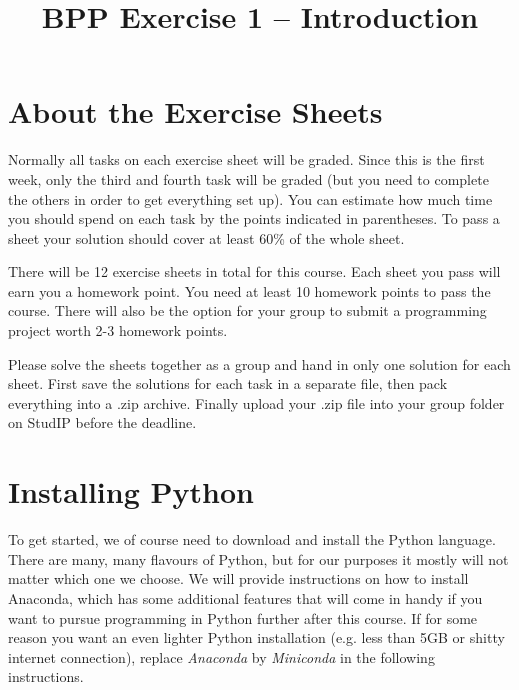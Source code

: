 

\makeatletter
{}
\tw@make@key@macro*{\OS}
\makeatother

\title{BPP Exercise 1 -- Introduction}




\section*{About the Exercise Sheets}

Normally all tasks on each exercise sheet will be graded. Since this is the first week, only the third and fourth task will be graded (but you need to complete the others in order to get everything set up). You can estimate how much time you should spend on each task by the points indicated in parentheses. To pass a sheet your solution should cover at least 60\% of the whole sheet.

\vspace{1em}

\noindent There will be 12 exercise sheets in total for this course. Each sheet you pass will earn you a homework point. You need at least 10 homework points to pass the course. There will also be the option for your group to submit a programming project worth 2-3 homework points.

\vspace{1em}

\noindent Please solve the sheets together as a group and hand in only one solution for each sheet. First save the solutions for each task in a separate file, then pack everything into a .zip archive. Finally upload your .zip file into your group folder on StudIP before the deadline.


\section{Installing Python}

To get started, we of course need to download and install the Python language. There are many, many flavours of Python, but for our purposes it mostly will not matter which one we choose. We will provide instructions on how to install Anaconda, which has some additional features that will come in handy if you want to pursue programming in Python further after this course. If for some reason you want an even lighter Python installation (e.g. less than 5GB or shitty internet connection), replace \textit{Anaconda} by \textit{Miniconda} in the following instructions.

